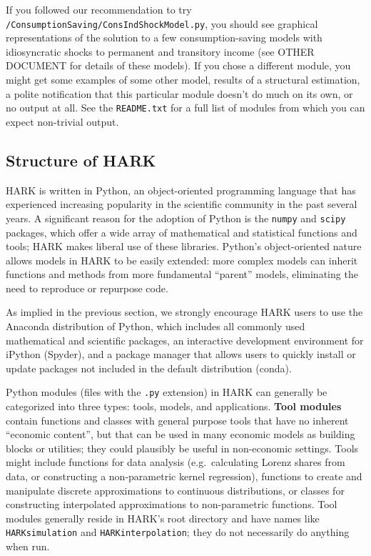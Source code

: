 \documentclass[12pt,titlepage,letterpaper]{econtex}
\begin{document}
If you followed our recommendation to try \texttt{/ConsumptionSaving/ConsIndShockModel.py}, you should see graphical representations of the solution to a few consumption-saving models with idiosyncratic shocks to permanent and transitory income (see OTHER DOCUMENT for details of these models).  If you chose a different module, you might get some examples of some other model, results of a structural estimation, a polite notification that this particular module doesn't do much on its own, or no output at all.  See the \texttt{README.txt} for a full list of modules from which you can expect non-trivial output.

\subsection{Structure of HARK}\label{sec:StructureOfHARK}

HARK is written in Python, an object-oriented programming language that has experienced increasing popularity in the scientific community in the past several years.  A significant reason for the adoption of Python is the \texttt{numpy} and \texttt{scipy} packages, which offer a wide array of mathematical and statistical functions and tools; HARK makes liberal use of these libraries.  Python's object-oriented nature allows models in HARK to be easily extended: more complex models can inherit functions and methods from more fundamental ``parent'' models, eliminating the need to reproduce or repurpose code.

As implied in the previous section, we strongly encourage HARK users to use the Anaconda distribution of Python, which includes all commonly used mathematical and scientific packages, an interactive development environment for iPython (Spyder), and a package manager that allows users to quickly install or update packages not included in the default distribution (conda).

Python modules (files with the \texttt{.py} extension) in HARK can generally be categorized into three types: tools, models, and applications.  \textbf{Tool modules} contain functions and classes with general purpose tools that have no inherent ``economic content'', but that can be used in many economic models as building blocks or utilities; they could plausibly be useful in non-economic settings.  Tools might include functions for data analysis (e.g.\ calculating Lorenz shares from data, or constructing a non-parametric kernel regression), functions to create and manipulate discrete approximations to continuous distributions, or classes for constructing interpolated approximations to non-parametric functions.  Tool modules generally reside in HARK's root directory and have names like \texttt{HARKsimulation} and \texttt{HARKinterpolation}; they do not necessarily do anything when run.
\end{document}
